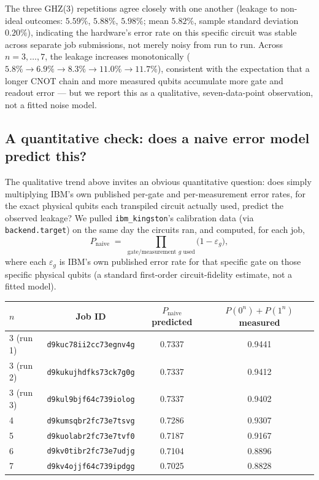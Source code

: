 \documentclass[11pt]{article}
\begin{document}
The three GHZ(3) repetitions agree closely with one another (leakage to
non-ideal outcomes: $5.59\%$, $5.88\%$, $5.98\%$; mean $5.82\%$, sample
standard deviation $0.20\%$), indicating the hardware's error rate on
this specific circuit was stable across separate job submissions, not
merely noisy from run to run. Across $n = 3,\ldots,7$, the leakage
increases monotonically ($5.8\% \to 6.9\% \to 8.3\% \to 11.0\% \to
11.7\%$), consistent with the expectation that a longer CNOT chain and
more measured qubits accumulate more gate and readout error --- but we
report this as a qualitative, seven-data-point observation, not a fitted
noise model.

\subsection{A quantitative check: does a naive error model predict this?}

The qualitative trend above invites an obvious quantitative question:
does simply multiplying IBM's own published per-gate and per-measurement
error rates, for the exact physical qubits each transpiled circuit
actually used, predict the observed leakage? We pulled
\texttt{ibm\_kingston}'s calibration data (via \texttt{backend.target})
on the same day the circuits ran, and computed, for each job,
\[
  P_{\text{naive}} \;=\; \prod_{\text{gate/measurement } g \text{ used}}
  \bigl(1 - \varepsilon_g\bigr),
\]
where each $\varepsilon_g$ is IBM's own published error rate for that
specific gate on those specific physical qubits (a standard first-order
circuit-fidelity estimate, not a fitted model).

\begin{center}
\begin{tabular}{lccc}
$n$ & Job ID & $P_{\text{naive}}$ predicted & $P(0^n)+P(1^n)$ measured \\
\hline
3 (run 1) & \texttt{d9kuc78ii2cc73egnv4g} & 0.7337 & 0.9441 \\
3 (run 2) & \texttt{d9kukujhdfks73ck7g0g} & 0.7337 & 0.9412 \\
3 (run 3) & \texttt{d9kul9bjf64c739iolog} & 0.7337 & 0.9402 \\
4 & \texttt{d9kumsqbr2fc73e7tsvg} & 0.7286 & 0.9307 \\
5 & \texttt{d9kuolabr2fc73e7tvf0} & 0.7187 & 0.9167 \\
6 & \texttt{d9kv0tibr2fc73e7udjg} & 0.7104 & 0.8896 \\
7 & \texttt{d9kv4ojjf64c739ipdgg} & 0.7025 & 0.8828 \\
\end{tabular}
\end{center}
\end{document}
